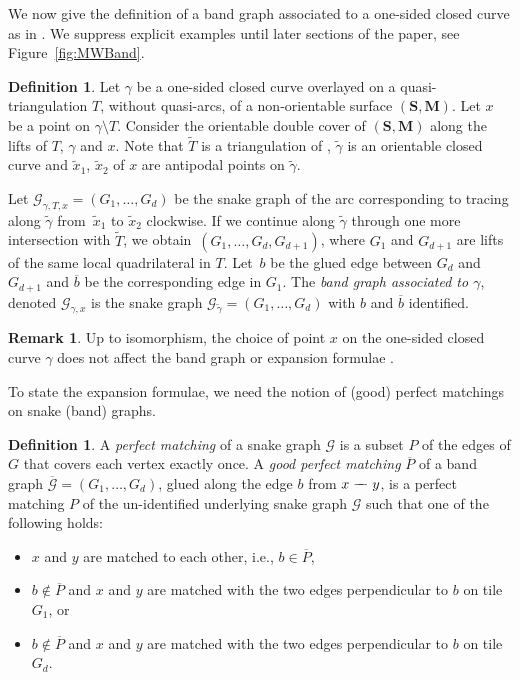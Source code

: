 \documentclass[10pt,a4paper]{amsart}
\numberwithin{equation}{section}
\theoremstyle{definition}
\newtheorem{Definition}[Theorem]{Definition}
\newtheorem{Remark}[Theorem]{Remark}
\newcommand{\SM}{(\mathbf{S}, \mathbf{M})}
\newcommand{\mathdash}{\relbar\mkern-9mu\relbar}
\begin{document}
We now give the definition of a band graph associated to a one-sided closed curve as in \cite{Wil19}. We suppress explicit examples until later sections of the paper, see Figure~\ref{fig:MWBand}.

\begin{Definition}\label{definition:bandgraphquasiarc}
 Let $\gamma$ be a one-sided closed curve overlayed on a quasi-triangulation $T$, without quasi-arcs, of a non-orientable surface $\SM$. Let $x$ be a point on $\gamma \setminus T$. Consider the orientable double cover \smash{$\widetilde{\SM}$} of $\SM$ along the lifts of $T$, $\gamma$ and $x$. Note that $\tilde{T}$ is a triangulation of \smash{$\widetilde{\SM}$}, $\tilde{\gamma}$ is an orientable closed curve and $\tilde{x}_1$, $\tilde{x}_2$ of $x$ are antipodal points on $\tilde{\gamma}$.

 Let $\mathcal{G}_{\gamma, T, x} = (G_1, \dots, G_d)$ be the snake graph of the arc corresponding to tracing along $\tilde{\gamma}$ from~$\tilde{x}_1$ to $\tilde{x}_2$ clockwise. If we continue along $\tilde{\gamma}$ through one more intersection with $\tilde{T}$, we obtain~${(G_1, \dots, G_d, G_{d+1})}$, where $G_1$ and $G_{d+1}$ are lifts of the same local quadrilateral in $T$. Let~$b$ be the glued edge between $G_d$ and $G_{d+1}$ and $\overline{b}$ be the corresponding edge in $G_1$. The \emph{band graph associated to $\gamma$}, denoted $\mathcal{G}_{\gamma, x}$ is the snake graph $\mathcal{G}_{\tilde{\gamma}} = (G_1, \dots, G_d)$ with $b$ and $\overline{b}$ identified.
\end{Definition}

\begin{Remark}
 Up to isomorphism, the choice of point $x$ on the one-sided closed curve $\gamma$ does not affect the band graph or expansion formulae \cite{Wil19}.
\end{Remark}

To state the expansion formulae, we need the notion of (good) perfect matchings on snake (band) graphs.

\begin{Definition}\label{definition:goodperfectmatching}
 A \emph{perfect matching} of a snake graph $\mathcal{G}$ is a subset $P$ of the edges of $G$ that covers each vertex exactly once. A \emph{good perfect matching} $\overline{P}$ of a band graph $\overline{\mathcal{G}} = (G_1, \dots, G_d)$, glued along the edge $b$ from $x \mathdash y$, is a perfect matching $P$ of the un-identified underlying snake graph $\mathcal{G}$ such that one of the following holds:
 \begin{itemize}\itemsep=0pt
 \item $x$ and $y$ are matched to each other, i.e., $b \in \overline{P}$,
 \item $b \notin \overline{P}$ and $x$ and $y$ are matched with the two edges perpendicular to $b$ on tile $G_1$, or
 \item $b \notin \overline{P}$ and $x$ and $y$ are matched with the two edges perpendicular to $b$ on tile $G_d$.
 \end{itemize}
\end{Definition}
\end{document}
